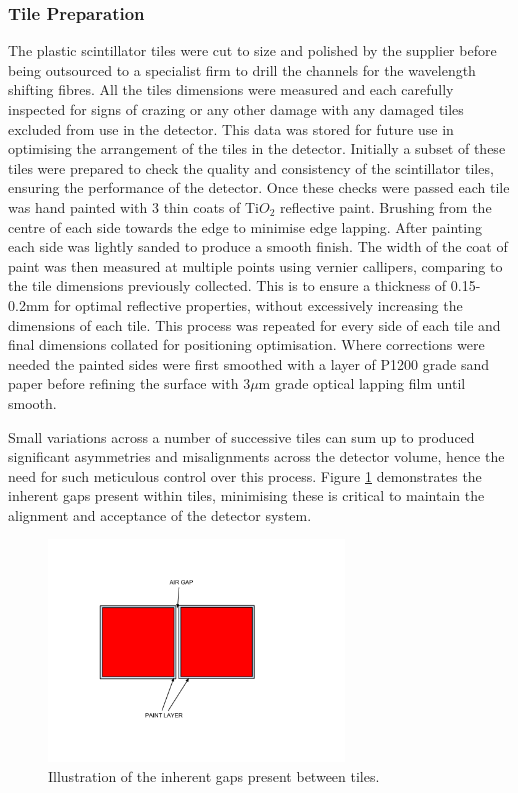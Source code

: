 \subsubsection*{Tile Preparation}

The plastic scintillator tiles were cut  to size and polished by the supplier before being outsourced to a specialist firm to drill the channels for the wavelength shifting fibres. All the tiles dimensions were measured and each carefully inspected for signs of crazing or any other damage with any damaged tiles excluded from use in the detector. This data was stored for future use in optimising the arrangement of the tiles in the detector. Initially a subset of these tiles were prepared to check the quality and consistency of the scintillator tiles, ensuring the performance of the detector. Once these checks were passed each tile was hand painted with 3 thin coats of Ti$O_{2}$ reflective paint. Brushing from the centre of each side towards the edge to minimise edge lapping. After painting each side was lightly sanded to produce a smooth finish. The width of the coat of paint was then measured at multiple points using vernier callipers, comparing to the tile dimensions previously collected. This is to ensure a thickness of 0.15-0.2mm for optimal reflective properties, without excessively increasing the dimensions of each tile. This process was repeated for every side of each tile and final dimensions collated for positioning optimisation. Where corrections were needed the painted sides were first smoothed with a layer of P1200 grade sand paper before refining the surface with $3\mu$m grade optical lapping film until smooth.

Small variations across a number of successive tiles can sum up to produced significant asymmetries and misalignments across the detector volume, hence the need for such meticulous control over this process. Figure \ref{elementgap} demonstrates the inherent gaps present within tiles, minimising these is critical to maintain the alignment and acceptance of the detector system.

\begin{figure}[!ht]
	\centering
	\includegraphics[width=0.7\textwidth]{ImgChap1/gap}
	\caption{Illustration of the inherent gaps present between tiles.}
	\label{elementgap}
\end{figure}


